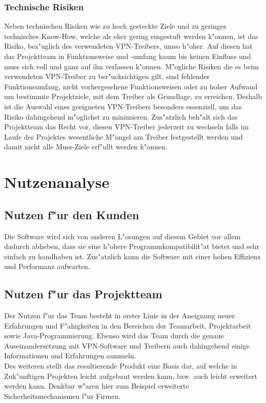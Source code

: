 \documentclass[a4paper,12pt]{scrreprt}
\begin{document}
		
		\subsection{Technische Risiken}
	Neben technischen Risiken wie zu hoch gesteckte Ziele und zu geringes technisches Know-How, welche als eher gering eingestuft werden k"onnen, ist das Risiko, bez"uglich des  verwendeten VPN-Treibers, umso h"oher. Auf diesen hat das Projektteam in Funktionsweise und -umfang kaum bis keinen Einfluss und muss sich voll und ganz auf ihn verlassen k"onnen. M"ogliche Risiken die es beim verwendeten VPN-Treiber zu ber"ucksichtigen gilt, sind fehlender Funktionsumfang, nicht vorhergesehene Funktionsweisen oder zu hoher Aufwand um bestimmte Projektziele, mit dem Treiber als Grundlage, zu erreichen. Deshalb ist die Auswahl eines geeigneten VPN-Treibers besonders essenziell, um das Risiko dahingehend m"oglichst zu minimieren. Zus"atzlich beh"alt sich das Projektteam das Recht vor, diesen VPN-Treiber jederzeit zu wechseln falls im Laufe des Projektes wesentliche M"angel am Treiber festgestellt werden und damit nicht alle Muss-Ziele erf"ullt werden k"onnen.
		
			
\chapter{Nutzenanalyse}
	
	\section{Nutzen f"ur den Kunden}
	Die Software wird sich von anderen L"osungen auf diesem Gebiet vor allem dadurch abheben, dass sie eine h"ohere Programmkompatibilit"at bietet und sehr einfach zu handhaben ist. Zus"atzlich kann die Software mit einer hohen Effizienz und Performanz aufwarten.
	
	\section{Nutzen f"ur das Projektteam}
	
	Der Nutzen f"ur das Team besteht in erster Linie in der Aneignung neuer Erfahrungen und F"ahigkeiten in den Bereichen der Teamarbeit, Projektarbeit sowie Java-Programmierung. Ebenso wird das Team durch die genaue Auseinandersetzung mit VPN-Software und Treibern auch dahingehend einige Informationen und Erfahrungen sammeln.\\
	Des weiteren stellt das resultierende Produkt eine Basis dar, auf welche in Zuk"unftigen Projekten leicht aufgebaut werden kann, bzw. auch leicht erweitert werden kann. Denkbar w"aren hier zum Beispiel erweiterte Sicherheitsmechanismen f"ur Firmen.
	
\end{document}

